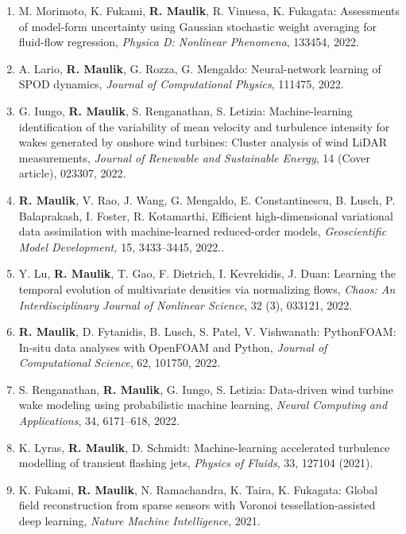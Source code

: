 \documentclass[letterpaper]{article}
\begin{document}
\begin{enumerate}
\item M. Morimoto, K. Fukami, \textbf{R. Maulik}, R. Vinuesa, K. Fukagata: Assessments of model-form uncertainty using Gaussian stochastic weight averaging for fluid-flow regression, {\it Physica D: Nonlinear Phenomena}, 133454, 2022.

\item A. Lario, \textbf{R. Maulik}, G. Rozza, G. Mengaldo: Neural-network learning of SPOD dynamics, {\it Journal of Computational Physics}, 111475, 2022.

\item G. Iungo, \textbf{R. Maulik}, S. Renganathan, S. Letizia: Machine-learning identification of the variability of mean velocity and turbulence intensity for wakes generated by onshore wind turbines: Cluster analysis of wind LiDAR measurements, {\it Journal of Renewable and Sustainable Energy}, 14 (Cover article), 023307, 2022.

\item \textbf{R. Maulik}, V. Rao, J. Wang, G. Mengaldo, E. Constantinescu, B. Lusch, P. Balaprakash, I. Foster, R. Kotamarthi, Efficient high-dimensional variational data assimilation with machine-learned reduced-order models, {\it Geoscientific Model Development,} 15, 3433–3445, 2022..

\item Y. Lu, \textbf{R. Maulik}, T. Gao, F. Dietrich, I. Kevrekidis, J. Duan: Learning the temporal evolution of multivariate densities via normalizing flows, {\it Chaos: An Interdisciplinary Journal of Nonlinear Science}, 32 (3), 033121, 2022.

\item \textbf{R. Maulik}, D. Fytanidis, B. Lusch, S. Patel, V. Vishwanath: PythonFOAM: In-situ data analyses with OpenFOAM and Python, {\it Journal of Computational Science}, 62, 101750, 2022.

\item S. Renganathan, \textbf{R. Maulik}, G. Iungo, S. Letizia: Data-driven wind turbine wake modeling using probabilistic machine learning, {\it Neural Computing and Applications}, 34, 6171–618, 2022.

\item K. Lyras, \textbf{R. Maulik}, D. Schmidt: Machine-learning accelerated turbulence modelling of transient flashing jets, {\it Physics of Fluids}, 33, 127104 (2021).

\item K. Fukami, \textbf{R. Maulik}, N. Ramachandra, K. Taira, K. Fukagata: Global field reconstruction from sparse sensors with Voronoi tessellation-assisted deep learning, {\it Nature Machine Intelligence}, 2021.


\end{enumerate}
\end{document}
